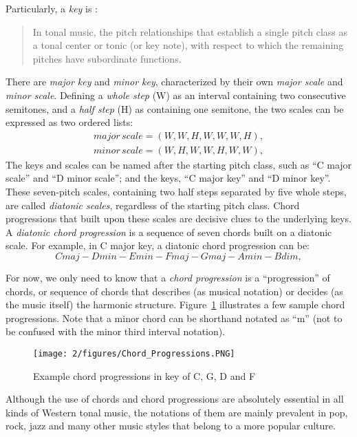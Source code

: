 Particularly, a {\it key} is \cite{randel1999harvard}:
\begin{quote}
In tonal music, the pitch relationships that establish a single pitch class as a tonal center or tonic (or key note), with respect to which the remaining pitches have subordinate functions.
\end{quote}
There are {\it major key} and {\it minor key}, characterized by their own {\it major scale} and {\it minor scale}. Defining a {\it whole step} (W) as an interval containing two consecutive semitones, and a {\it half step} (H) as containing one semitone, the two scales can be expressed as two ordered lists:
\begin{equation}
\begin{split}
\mathit{major\,scale=(W,W, H,W,W,W, H)},\\
\mathit{minor\,scale=(W,H,W,W,H,W,W),}
\end{split}
\end{equation}
The keys and scales can be named after the starting pitch class, such as ``C major scale'' and ``D minor scale''; and the keys, ``C major key'' and ``D minor key''.  These seven-pitch scales, containing two half steps separated by five whole steps, are called {\it diatonic scales}, regardless of the starting pitch class. Chord progressions that built upon these scales are decisive clues to the underlying keys. A {\it diatonic chord progression} is a sequence of seven chords built on a diatonic scale. For example, in C major key, a diatonic chord progression can be:
\begin{equation}
\mathit{Cmaj - Dmin - Emin - Fmaj - Gmaj - Amin - Bdim,}
\end{equation}

For now, we only need to know that a {\it chord progression} is a ``progression'' of chords, or sequence of chords that describes (as musical notation) or decides (as the music itself) the harmonic structure. Figure~\ref{fig:2-chordprogression} illustrates a few sample chord progressions. Note that a minor chord can be shorthand notated as ``m'' (not to be confused with the minor third interval notation).
\begin{figure}[htb]
\centering
\texttt{[image: 2/figures/Chord\_Progressions.PNG]}
\caption{Example chord progressions in key of C, G, D and F}
\label{fig:2-chordprogression}
\end{figure}
Although the use of chords and chord progressions are absolutely essential in all kinds of Western tonal music, the notations of them are mainly prevalent in pop, rock, jazz and many other music styles that belong to a more popular culture.

